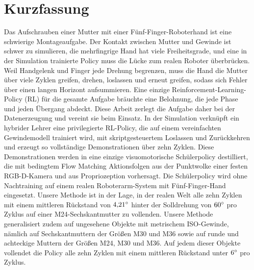 \section*{\color{TUMBlack}Kurzfassung}%
Das Aufschrauben einer Mutter mit einer Fünf-Finger-Roboterhand ist eine schwierige Montageaufgabe. Der Kontakt zwischen Mutter und Gewinde ist schwer zu simulieren, die mehrfingrige Hand hat viele Freiheitsgrade, und eine in der Simulation trainierte Policy muss die Lücke zum realen Roboter überbrücken. Weil Handgelenk und Finger jede Drehung begrenzen, muss die Hand die Mutter über viele Zyklen greifen, drehen, loslassen und erneut greifen, sodass sich Fehler über einen langen Horizont aufsummieren. Eine einzige Reinforcement-Learning-Policy (RL) für die gesamte Aufgabe bräuchte eine Belohnung, die jede Phase und jeden Übergang abdeckt. Diese Arbeit zerlegt die Aufgabe daher bei der Datenerzeugung und vereint sie beim Einsatz. In der Simulation verknüpft ein hybrider Lehrer eine privilegierte RL-Policy, die auf einem vereinfachten Gewindemodell trainiert wird, mit skriptgesteuertem Loslassen und Zurückkehren und erzeugt so vollständige Demonstrationen über zehn Zyklen. Diese Demonstrationen werden in eine einzige visuomotorische Schülerpolicy destilliert, die mit bedingtem Flow Matching Aktionsfolgen aus der Punktwolke einer festen RGB-D-Kamera und aus Propriozeption vorhersagt. Die Schülerpolicy wird ohne Nachtraining auf einem realen Roboterarm-System mit Fünf-Finger-Hand eingesetzt. Unsere Methode ist in der Lage, in der realen Welt alle zehn Zyklen mit einem mittleren Rückstand von $4{,}21^\circ$ hinter der Solldrehung von $60^\circ$ pro Zyklus auf einer M24-Sechskantmutter zu vollenden. Unsere Methode generalisiert zudem auf ungesehene Objekte mit metrischem ISO-Gewinde, nämlich auf Sechskantmuttern der Größen M30 und M36 sowie auf runde und achteckige Muttern der Größen M24, M30 und M36. Auf jedem dieser Objekte vollendet die Policy alle zehn Zyklen mit einem mittleren Rückstand unter $6^\circ$ pro Zyklus.%
\vfill%
\cleardoublepage%
\restoregeometry%
